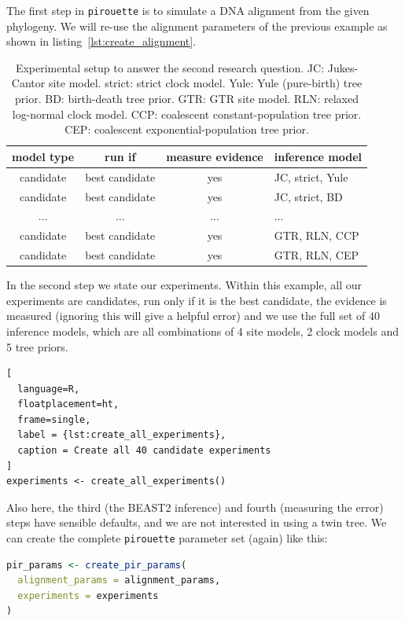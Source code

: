 \documentclass{article}
\begin{document}
The first step in \verb;pirouette; is to simulate a DNA alignment from the given phylogeny. 
We will re-use the alignment parameters of the previous example 
as shown in listing~\ref{lst:create_alignment}.

\begin{table}
  \begin{tabular}{ | c | c | c | l | }
    \hline
    \textbf{model type} & \textbf{run if} & \textbf{measure evidence} & \textbf{inference model} \\ 
    \hline
    candidate & best candidate & yes & JC, strict, Yule \\
    candidate & best candidate & yes & JC, strict, BD   \\
    ...       & ...            & ... & ...              \\
    candidate & best candidate & yes & GTR, RLN, CCP    \\
    candidate & best candidate & yes & GTR, RLN, CEP    \\
    \hline
  \end{tabular}
  \caption{
    Experimental setup to answer the second research question.
    JC: Jukes-Cantor site model.
    strict: strict clock model.
    Yule: Yule (pure-birth) tree prior.
    BD: birth-death tree prior.
    GTR: GTR site model.
    RLN: relaxed log-normal clock model.
    CCP: coalescent constant-population tree prior.
    CEP: coalescent exponential-population tree prior.
  }
\end{table}

In the second step we state our experiments. 
Within this example, all our experiments are candidates,
run only if it is the best candidate, the evidence is measured (ignoring
this will give a helpful error) and we use the full set of 
40 inference models, which are all combinations of 4 site 
models, 2 clock models and 5 tree priors.

\begin{lstlisting}[
  language=R, 
  floatplacement=ht, 
  frame=single, 
  label = {lst:create_all_experiments},
  caption = Create all 40 candidate experiments
]
experiments <- create_all_experiments()
\end{lstlisting}

Also here, the third (the BEAST2 inference) and fourth (measuring the error)
steps have sensible defaults, and we are not
interested in using a twin tree. We can create the complete
\verb;pirouette; parameter set (again) like this:

\begin{lstlisting}[language=R, floatplacement=ht, frame=single]
pir_params <- create_pir_params(
  alignment_params = alignment_params,
  experiments = experiments
)
\end{lstlisting}
\end{document}
